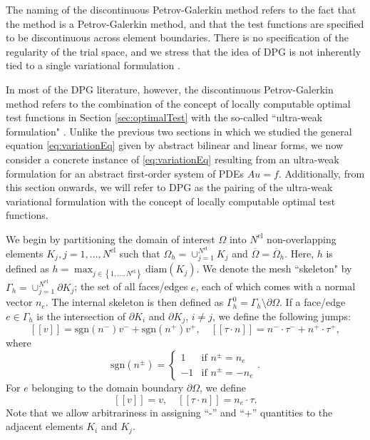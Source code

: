 \documentclass[11pt,onecolumn]{scrartcl}
\newcommand{\eqnref}[1]{\eqref{eq:#1}}
\newcommand{\secref}[1]{\ref{sec:#1}}
\newcommand{\LRp}[1]{\left( #1 \right)}
\newcommand{\LRs}[1]{\left[ #1 \right]}
\newcommand{\LRc}[1]{\left\{ #1 \right\}}
\newcommand{\Nel} {\ensuremath{{N^\text{el}}}}
\newcommand{\jump}[1] {\ensuremath{\LRs{\![#1]\!}}}
\newcommand{\Gh}{\Gamma_h}
\newcommand{\Oh}{\Omega_h}
\begin{document}
The naming of the discontinuous Petrov-Galerkin method refers to the fact that the method is a Petrov-Galerkin method, and that the test functions are specified to be discontinuous across element boundaries. There is no specification of the regularity of the trial space, and we stress that the idea of DPG is not inherently tied to a single variational formulation \cite{Bui-ThanhDemkowiczGhattas11a}. 

In most of the DPG literature, however, the discontinuous Petrov-Galerkin method refers to the combination of the concept of locally computable optimal test functions in Section \secref{optimalTest} with the so-called ``ultra-weak formulation" \cite{DPG1,DPG2,DPG3,DPG4,DPGElas,DBLP:journals/procedia/NiemiCC11}. Unlike the previous two sections in which we studied the general equation \eqnref{variationEq} given by abstract bilinear and linear forms, we now consider a concrete instance of \eqnref{variationEq} resulting from an ultra-weak formulation for an abstract first-order system of PDEs $Au = f$. Additionally, from this section onwards, we will refer to DPG as the pairing of the ultra-weak variational formulation with the concept of locally computable optimal test functions. 

We begin by partitioning the domain of interest $\Omega$ into $\Nel$ non-overlapping elements $K_j, j = 1,\hdots,\Nel$ such that $\Oh = \cup_{j=1}^\Nel K_j$ and $\overline{\Omega} = \overline{\Omega}_h$. Here, $h$ is defined as $h= \max_{j\in \LRc{1,\hdots,\Nel}}\text{diam}\LRp{K_j}$.  We denote the mesh ``skeleton" by $\Gh = \cup_{j=1}^\Nel \partial K_j$; the set of all faces/edges $e$, each of which comes with a normal vector ${n}_e$. The internal skeleton is then defined as $\Gamma^0_h = \Gh \setminus \partial \Omega$. If a face/edge $e \in \Gh$ is the intersection of $\partial K_i$ and $\partial K_j$, $i \ne j$, we define the following jumps:
\[
\jump{v} = \text{sgn} \LRp{{n}^-}v^- + \text{sgn} \LRp{{n}^+}v^+, \quad
\jump{\tau \cdot n} = {n}^-\cdot \tau^- + {n}^+\cdot\tau^+,
\]
where
\[
\text{sgn}\LRp{{n}^{\pm}} =
\left\{
\begin{array}{ll}
1 & \text{if } {n}^{\pm} = {n}_e \\
-1 & \text{if } {n}^\pm = -{n}_e
\end{array}
\right..
\]
For $e$ belonging to the domain boundary $\partial \Omega$, we define
\[
\jump{v} = v, \quad
\jump{\tau \cdot n} = {n}_e\cdot \tau.
\]
Note that we allow arbitrariness in assigning ``-'' and ``+'' quantities to the adjacent elements $K_i$ and $K_j$.
\end{document}
